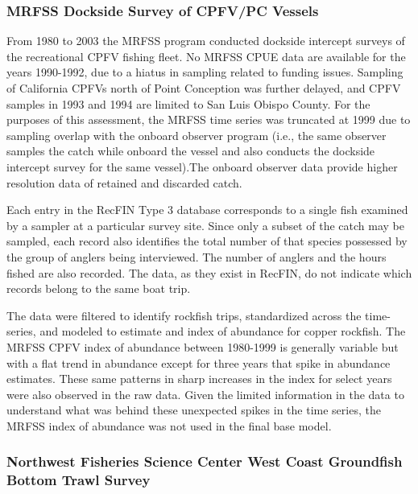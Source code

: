 \documentclass[11pt,
  english,
  letterpaper,
]{article}
\begin{document}
\hypertarget{mrfss-dockside-survey-of-cpfvpc-vessels}{%
\subsubsection{MRFSS Dockside Survey of CPFV/PC Vessels}\label{mrfss-dockside-survey-of-cpfvpc-vessels}}

From 1980 to 2003 the MRFSS program conducted dockside intercept surveys of the recreational CPFV fishing fleet. No MRFSS CPUE data are available for the years 1990-1992, due to a hiatus in sampling related to funding issues. Sampling of California CPFVs north of Point Conception was further delayed, and CPFV samples in 1993 and 1994 are limited to San Luis Obispo County. For the purposes of this assessment, the MRFSS time series was truncated at 1999 due to sampling overlap with the onboard observer program (i.e., the same observer samples the catch while onboard the vessel and also conducts the dockside intercept survey for the same vessel).The onboard observer data provide higher resolution data of retained and discarded catch.

Each entry in the RecFIN Type 3 database corresponds to a single fish examined by a sampler at a particular survey site. Since only a subset of the catch may be sampled, each record also identifies the total number of that species possessed by the group of anglers being interviewed. The number of anglers and the hours fished are also recorded. The data, as they exist in RecFIN, do not indicate which records belong to the same boat trip.

The data were filtered to identify rockfish trips, standardized across the time-series, and modeled to estimate and index of abundance for copper rockfish. The MRFSS CPFV index of abundance between 1980-1999 is generally variable but with a flat trend in abundance except for three years that spike in abundance estimates. These same patterns in sharp increases in the index for select years were also observed in the raw data. Given the limited information in the data to understand what was behind these unexpected spikes in the time series, the MRFSS index of abundance was not used in the final base model.

\hypertarget{northwest-fisheries-science-center-west-coast-groundfish-bottom-trawl-survey}{%
\subsubsection{Northwest Fisheries Science Center West Coast Groundfish Bottom Trawl Survey}\label{northwest-fisheries-science-center-west-coast-groundfish-bottom-trawl-survey}}
\end{document}

